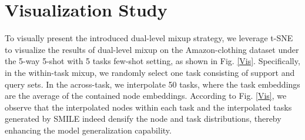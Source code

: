 \section{Visualization Study}
\label{visualization_study}
\begin{figure*}[ht]
\renewcommand{\thefigure}{S3}
    \centering
    \caption{Visualization of the dual-level mixup strategies. In (a), the original nodes in each task are represented by triangles, while the generated nodes are represented by circles, with colors indicating the corresponding classes. In (b), the original tasks are represented by triangles, the generated tasks are represented by circles, and the colors indicate the most similar original tasks.}
    \label{Vis}
\end{figure*}
To visually present the introduced dual-level mixup strategy, we leverage t-SNE \cite{van2008visualizing} to visualize the results of dual-level mixup on the Amazon-clothing dataset under the 5-way 5-shot with 5 tasks few-shot setting, as shown in Fig. \ref{Vis}. Specifically, in the within-task mixup, we randomly select one task consisting of support and query sets. In the across-task, we interpolate 50 tasks, where the task embeddings are the average of the contained node embeddings. According to Fig. \ref{Vis}, we observe that the interpolated nodes within each task and the interpolated tasks generated by SMILE indeed densify the node and task distributions, thereby enhancing the model generalization capability.


